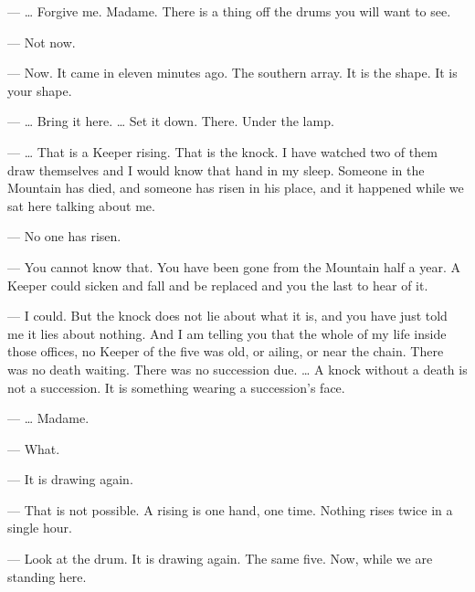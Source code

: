 \begin{room}

--- \ldots{} Forgive me. Madame. There is a thing off the drums you will want to see.

--- Not now.

--- Now. It came in eleven minutes ago. The southern array. It is the shape. It is your shape.

--- \ldots{} Bring it here. \ldots{} Set it down. There. Under the lamp.

--- \ldots{} That is a Keeper rising. That is the knock. I have watched two of them draw themselves and I would know that hand in my sleep. Someone in the Mountain has died, and someone has risen in his place, and it happened while we sat here talking about me.

--- No one has risen.

--- You cannot know that. You have been gone from the Mountain half a year. A Keeper could sicken and fall and be replaced and you the last to hear of it.

--- I could. But the knock does not lie about what it is, and you have just told me it lies about nothing. And I am telling you that the whole of my life inside those offices, no Keeper of the five was old, or ailing, or near the chain. There was no death waiting. There was no succession due. \ldots{} A knock without a death is not a succession. It is something wearing a succession's face.

--- \ldots{} Madame.

--- What.

--- It is drawing again.

--- That is not possible. A rising is one hand, one time. Nothing rises twice in a single hour.

--- Look at the drum. It is drawing again. The same five. Now, while we are standing here.

\end{room}
